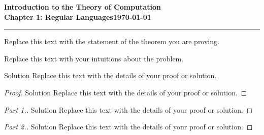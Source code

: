 \documentclass[11pt]{article}
\newcommand{\dated}{\today}
\begin{document}
\textbf{Introduction to the Theory of
Computation}\hfill\textbf{\myname}\\[0.01in]
\textbf{Chapter 1: Regular Languages}\hfill\textbf{\dated}\\
\smallskip\hrule\bigskip

\begin{problem}{1.1}
Replace this text with the statement of the theorem you are proving.
\end{problem}

\begin{idea}
Replace this text with your intuitions about the problem.
\end{idea}

\begin{solution}
Solution Replace this text with the details of your proof or solution.
\end{solution}

\begin{proof}
Solution Replace this text with the details of your proof or solution.
\end{proof}

\begin{proof}[Part 1.]
Solution Replace this text with the details of your proof or solution.
\end{proof}

\begin{proof}[Part 2.]
Solution Replace this text with the details of your proof or solution.
\end{proof}
\end{document}
